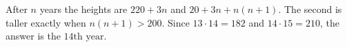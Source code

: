 After $n$ years the heights are $220+3n$ and $20+3n+n(n+1)$. The second is taller exactly when $n(n+1)>200$. Since $13\cdot14=182$ and $14\cdot15=210$, the answer is the $\boxed{14\text{th year}}$.
